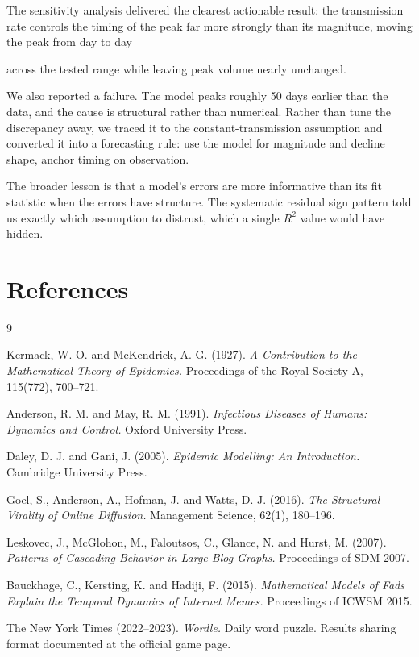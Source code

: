 \documentclass[12pt]{article}
\begin{document}
The sensitivity analysis delivered the clearest actionable result: the
transmission rate controls the timing of the peak far more strongly than its
magnitude, moving the peak from day 
\numPeakDayBetaZeroTwoZero{} to day

\numPeakDayBetaZeroFourFive{} across the tested range while leaving peak volume nearly
unchanged.

We also reported a failure. The model peaks roughly 50 days earlier than the
data, and the cause is structural rather than numerical. Rather than tune the
discrepancy away, we traced it to the constant-transmission assumption and
converted it into a forecasting rule: use the model for magnitude and decline
shape, anchor timing on observation.

The broader lesson is that a model's errors are more informative than its fit
statistic when the errors have structure. The systematic residual sign pattern
told us exactly which assumption to distrust, which a single $R^{2}$ value would
have hidden.

\section{References}\label{sec:SEC-090}
\begin{thebibliography}{9}

Kermack, W. O. and McKendrick, A. G. (1927).
\textit{A Contribution to the Mathematical Theory of Epidemics.}
Proceedings of the Royal Society A, 115(772), 700--721.

Anderson, R. M. and May, R. M. (1991).
\textit{Infectious Diseases of Humans: Dynamics and Control.}
Oxford University Press.

Daley, D. J. and Gani, J. (2005).
\textit{Epidemic Modelling: An Introduction.}
Cambridge University Press.

Goel, S., Anderson, A., Hofman, J. and Watts, D. J. (2016).
\textit{The Structural Virality of Online Diffusion.}
Management Science, 62(1), 180--196.

Leskovec, J., McGlohon, M., Faloutsos, C., Glance, N. and Hurst, M. (2007).
\textit{Patterns of Cascading Behavior in Large Blog Graphs.}
Proceedings of SDM 2007.

Bauckhage, C., Kersting, K. and Hadiji, F. (2015).
\textit{Mathematical Models of Fads Explain the Temporal Dynamics of Internet Memes.}
Proceedings of ICWSM 2015.

The New York Times (2022--2023).
\textit{Wordle.} Daily word puzzle. Results sharing format documented at
the official game page.

\end{thebibliography}
\end{document}
